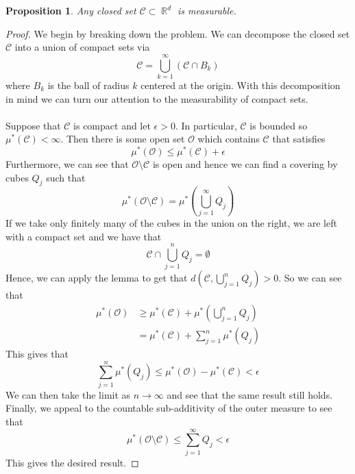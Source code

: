 \documentclass{article}
\DeclareMathOperator{\R}{\mathbb{R}}
\newtheorem*{prop}{Proposition}
\begin{document}
\begin{prop}
Any closed set $\mathcal{C} \subset \R^d$ is measurable.
\end{prop}
\begin{proof}
We begin by breaking down the problem. We can decompose the closed set $\mathcal{C}$ into a union of compact sets via
\[
\mathcal{C} = \bigcup_{k=1}^\infty (\mathcal{C} \cap B_k)
\]
where $B_k$ is the ball of radius $k$ centered at the origin. With this decomposition in mind we can turn our attention to the measurability of compact sets. 
\paragraph*{} Suppose that $\mathcal{C}$ is compact and let $\epsilon > 0$. In particular, $\mathcal{C}$ is bounded so $\mu^*(\mathcal{C}) < \infty$. Then there is some open set $\mathcal{O}$ which contains $\mathcal{C}$ that satisfies
\[
\mu^*(\mathcal{O}) \leq \mu^*(\mathcal{C}) + \epsilon
\]
Furthermore, we can see that $\mathcal{O}\setminus \mathcal{C}$ is open and hence we can find a covering by cubes $Q_j$ such that 
\[
\mu^*(\mathcal{O}\setminus \mathcal{C}) = \mu^*\left(\bigcup_{j=1}^\infty Q_j\right)
\]
If we take only finitely many of the cubes in the union on the right, we are left with a compact set and we have that 
\[
\mathcal{C} \cap \bigcup_{j=1}^n Q_j = \emptyset
\]
Hence, we can apply the lemma to get that $d\left(\mathcal{C}, \bigcup_{j=1}^n Q_j\right) > 0$. So we can see that
\begin{align*}
\mu^*(\mathcal{O}) &\geq \mu^*(\mathcal{C}) + \mu^*\left(\bigcup_{j=1}^n Q_j\right) \\
&= \mu^*(\mathcal{C}) + \sum_{j=1}^n \mu^*(Q_j)
\end{align*} 
This gives that
\[
\sum_{j=1}^n \mu^*(Q_j) \leq \mu^*(\mathcal{O}) - \mu^*(\mathcal{C})< \epsilon
\]
We can then take the limit as $n\to \infty$ and see that the same result still holds. Finally, we appeal to the countable sub-additivity of the outer measure to see that
\[
\mu^*(\mathcal{O}\setminus\mathcal{C}) \leq \sum_{j=1}^\infty Q_j < \epsilon
\]
This gives the desired result. 
\end{proof}
\end{document}
